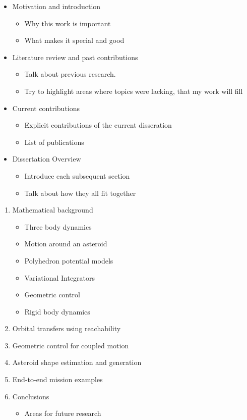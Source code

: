 \begin{itemize}
    \item Motivation and introduction
        \begin{itemize}
            \item Why this work is important
            \item What makes it special and good
        \end{itemize}
    \item Literature review and past contributions
        \begin{itemize}
            \item Talk about previous research.
            \item Try to highlight areas where topics were lacking, that my work will fill
        \end{itemize}
    \item Current contributions
        \begin{itemize}
            \item Explicit contributions of the current disseration
            \item List of publications
        \end{itemize}
    \item Dissertation Overview
        \begin{itemize}
            \item Introduce each subsequent section
            \item Talk about how they all fit together
        \end{itemize}

        
\end{itemize}

\begin{enumerate}
    \item Mathematical background
        \begin{itemize}
            \item Three body dynamics
            \item Motion around an asteroid
            \item Polyhedron potential models
            \item Variational Integrators
            \item Geometric control
            \item Rigid body dynamics
        \end{itemize}
    \item Orbital transfers using reachability
    \item Geometric control for coupled motion
    \item Asteroid shape estimation and generation
    \item End-to-end mission examples
    \item Conclusions
        \begin{itemize}
            \item Areas for future research
        \end{itemize}
\end{enumerate}

